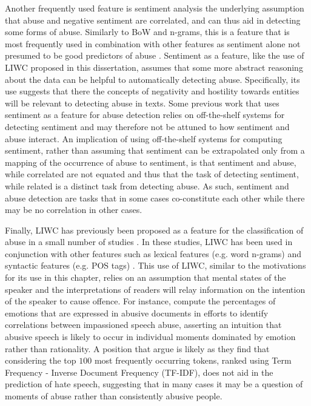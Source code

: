 Another frequently used feature is sentiment  analysis \citep{Fortuna:2018}  the underlying assumption that abuse and negative sentiment are correlated, and can thus aid in detecting some forms of abuse.  
Similarly to BoW and n-grams, this is a feature that is most frequently used in combination with other features as sentiment  alone  not presumed to be good predictors of abuse \citep{Fortuna:2018}.  
Sentiment as a feature, like the use of LIWC proposed in this dissertation, assumes that some more abstract reasoning about the data can be helpful to automatically detecting abuse.  
Specifically, its use suggests that there the concepts of negativity and hostility towards entities will be relevant to detecting abuse in texts.  
Some previous work that uses sentiment as a feature for abuse detection \citep{Davidson:2017} relies on off-the-shelf systems for detecting sentiment and may therefore not be attuned to how sentiment and abuse interact.  
An implication of using off-the-shelf systems for computing sentiment, rather than assuming that sentiment can be extrapolated only from a mapping of the occurrence of abuse to sentiment, is that sentiment and abuse, while correlated are not equated and thus that the task of detecting sentiment, while related is a distinct task from detecting abuse.  
As such, sentiment and abuse detection are tasks that in some cases co-constitute each other while there may be no correlation in other cases.  
  
Finally, LIWC has previously been proposed as a feature for the classification of abuse in a small number of studies \citep{Nina:2018,Joksimovic:2019}.  
In these studies, LIWC has been used in conjunction with other features such as lexical features (e.g. word n-grams) and syntactic features (e.g. POS tags) \citep{Joksimovic:2019}.  
This use of LIWC, similar to the motivations for its use in this chapter, relies on an assumption that  mental states of the speaker and the interpretations of readers will relay information on the intention of the speaker to cause offence.  
For instance, \citet{Nina:2018} compute the percentages of emotions that are expressed in abusive documents in efforts to identify correlations between impassioned  speech  abuse, asserting an intuition that abusive speech is likely to occur in individual moments dominated by emotion rather than rationality.  
A position that \citep{Waseem:2016} argue is likely as they find that considering the top $100$ most frequently occurring tokens, ranked using Term Frequency - Inverse Document Frequency (TF-IDF), does not aid in the prediction of hate speech, suggesting that in many cases it may be a question of moments of abuse rather than consistently abusive people.  
  
